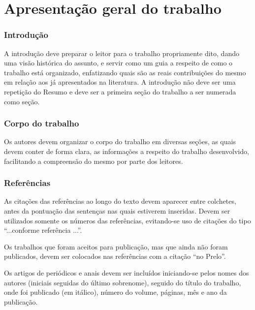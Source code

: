 %

\section*{Apresentação geral do trabalho}

\subsubsection{Introdução} 
A introdução deve preparar o leitor para o trabalho propriamente dito, dando uma visão histórica do assunto, e servir como um guia a respeito de como o trabalho está organizado, enfatizando quais são as reais contribuições do mesmo em relação aos já apresentados na literatura. A introdução não deve ser uma repetição do Resumo e deve ser a primeira seção do trabalho a ser numerada como seção.

\subsubsection{Corpo do trabalho} 
Os autores devem organizar o corpo do trabalho em diversas seções, as quais devem conter de forma clara, as informações a respeito do trabalho desenvolvido, facilitando a compreensão do mesmo por parte dos leitores.

\subsubsection{Referências} 
As citações das referências ao longo do texto devem aparecer entre colchetes, antes da pontuação das sentenças nas quais estiverem inseridas. Devem ser utilizados somente os números das referências, evitando-se uso de citações do tipo ``...conforme referência \cite{angulo_active_2013}...''.

Os trabalhos que foram aceitos para publicação, mas que ainda não foram publicados, devem ser colocados nas referências com a citação ``no Prelo''.

Os artigos de periódicos e anais devem ser incluídos iniciando-se pelos nomes dos autores (iniciais seguidas do último sobrenome), seguido do título do trabalho, onde foi publicado (em itálico), número do volume, páginas, mês e ano da publicação. 

